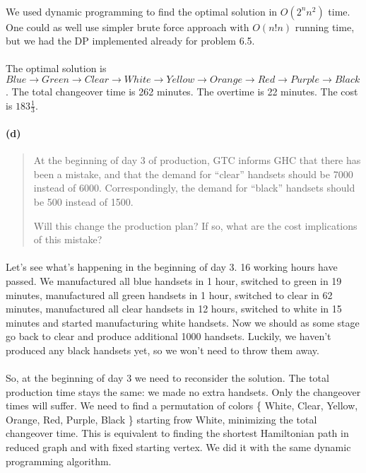\paragraph{}
We used dynamic programming to find the optimal solution in $O(2^n n^2)$ time. One could as well use simpler brute force approach with $O(n! n)$ running time, but we had the DP implemented already for problem 6.5.

\paragraph{}
The optimal solution is $ Blue \rightarrow Green \rightarrow Clear \rightarrow White \rightarrow Yellow \rightarrow Orange \rightarrow Red \rightarrow Purple \rightarrow Black $. The total changeover time is 262 minutes. The overtime is 22 minutes. The cost is \texteuro $183\frac{1}{3}$.

\paragraph{(d)}
\begin{quote}
At the beginning of day 3 of production, GTC informs GHC that there has been a mistake, and that the demand for “clear” handsets should be 7000 instead of 6000. Correspondingly, the demand for “black” handsets should be 500 instead of 1500.

Will this change the production plan? If so, what are the cost implications of this mistake?
\end{quote}

\paragraph{}
Let's see what's happening in the beginning of day 3. 16 working hours have passed. We manufactured all blue handsets in 1 hour, switched to green in 19 minutes, manufactured all green handsets in 1 hour, switched to clear in 62 minutes, manufactured all clear handsets in 12 hours, switched to white in 15 minutes and started manufacturing white handsets. Now we should as some stage go back to clear and produce additional 1000 handsets. Luckily, we haven't produced any black handsets yet, so we won't need to throw them away.

\paragraph{}
So, at the beginning of day 3 we need to reconsider the solution. The total production time stays the same: we made no extra handsets. Only the changeover times will suffer. We need to find a permutation of colors \{ White, Clear, Yellow, Orange, Red, Purple, Black \} starting frow White, minimizing the total changeover time. This is equivalent to finding the shortest Hamiltonian path in reduced graph and with fixed starting vertex. We did it with the same dynamic programming algorithm.

